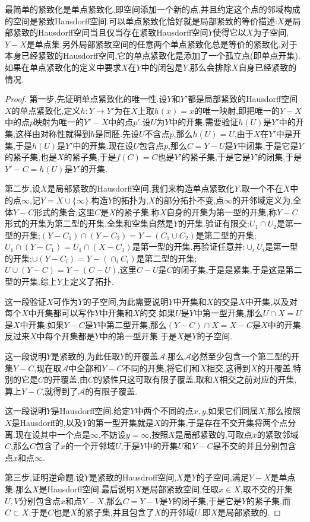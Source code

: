 最简单的紧致化是单点紧致化,即空间添加一个新的点,并且约定这个点的邻域构成的空间是紧致Hausdorff空间.可以单点紧致化恰好就是局部紧致的等价描述:$X$是局部紧致的Hausdorff空间当且仅当存在紧致Hausdorff空间$Y$使得它以$X$为子空间,$Y-X$是单点集.另外局部紧致空间的任意两个单点紧致化总是等价的紧致化.对于本身已经紧致的Hausdorff空间,它的单点紧致化是添加了一个孤立点(即单点开集).如果在单点紧致化的定义中要求$X$在$Y$中的闭包是$Y$,那么会排除$X$自身已经紧致的情况.
\begin{proof}
	
	第一步,先证明单点紧致化的唯一性.设$Y$和$Y'$都是局部紧致的Hausdorff空间$X$的单点紧致化,定义$h:Y\to Y'$为在$X$上取$h(x)=x$的唯一映射,即把唯一的$Y-X$中的点$p$映射为唯一的$Y'-X$中的点$p'$.设$U$为$Y$中的开集,需要验证$h(U)$是$Y'$中的开集,这样由对称性就得到$h$是同胚.先设$U$不含点$p$,那么$h(U)=U$,由于$X$在$Y'$中是开集,于是$h(U)$是$Y'$中的开集.现在设$U$包含点$p$,那么$C=Y-U$是$Y$中闭集,于是它是$Y$的紧子集,也是$X$的紧子集,于是$f(C)=C$也是$Y'$的紧子集,于是它是$Y'$的闭集,于是$Y'-C=h(U)$是$Y'$的开集.
	
	第二步,设$X$是局部紧致的Hausdorff空间,我们来构造单点紧致化$Y$.取一个不在$X$中的点$\infty$,记$Y=X\cup\{\infty\}$.构造$Y$的拓扑为,$X$的部分拓扑不变,点$\infty$的开邻域定义为,全体$Y-C$形式的集合,这里$C$是$X$的紧子集.称$X$自身的开集为第一型的开集,称$Y-C$形式的开集为第二型的开集.全集和空集自然是$Y$的开集.验证有限交:$U_1\cap U_2$是第一型的开集;$(Y-C_1)\cap(Y-C_2)=Y-(C_1\cup C_2)$是第二型的开集;$U_1\cap(Y-C_1)=U_1\cap(X-C_1)$是第一型的开集.再验证任意并:$\cup_i U_i$是第一型的开集;$\cup(Y-C_i)=Y-(\cap_iC_i)$是第二型的开集;$U\cup(Y-C)=Y-(C-U)$,这里$C-U$是$C$的闭子集,于是是紧集,于是这是第二型的开集.综上$Y$上定义了拓扑.
	
	这一段验证$X$可作为$Y$的子空间,为此需要说明$Y$中开集和$X$的交是$X$中开集,以及对每个$X$中开集都可以写作$Y$中开集和$X$的交.如果$U$是$Y$中第一型开集,那么$U\cap X=U$是$X$中开集;如果$Y-C$是$Y$中第二型开集,那么$(Y-C)\cap X=X-C$是$X$中的开集.反过来$X$中每个开集都是$Y$中的第一型开集.于是$X$是$Y$的子空间.
	
	这一段说明$Y$是紧致的,为此任取$Y$的开覆盖$\mathscr{A}$.那么$\mathscr{A}$必然至少包含一个第二型的开集$Y-C$,现在取$\mathscr{A}$中全部和$Y-C$不同的开集,将它们和$X$相交,这得到$X$的开覆盖,特别的它是$C$的开覆盖,由$C$的紧性只这可取有限子覆盖,取和$X$相交之前对应的开集,算上$Y-C$,就得到了$\mathscr{A}$的有限子覆盖.
	
	这一段说明$Y$是Hausdorff空间.给定$Y$中两个不同的点$x,y$,如果它们同属$X$,那么按照$X$是Hausdorff的,以及$Y$的第一型开集就是$X$的开集,于是存在不交开集将两个点分离.现在设其中一个点是$\infty$,不妨设$y=\infty$,按照$X$是局部紧致的,可取点$x$的紧致邻域$C$,那么$C$包含了$x$的一个开邻域$U$,于是$Y$中的开集$U$和$Y-C$是不交的并且分别包含点$x$和点$\infty$.
	
	第三步,证明逆命题.设$Y$是紧致的Hausdroff空间,$X$是$Y$的子空间,满足$Y-X$是单点集.那么$X$是Hausdorff空间.最后说明$X$是局部紧致空间,任取$x\in X$,取不交的开集$U,V$分别包含点$x$和点$Y-X$,那么$C=Y-V$是$Y$的闭子集,于是它是$Y$的紧子集,而$C\subset X$,于是$C$也是$X$的紧子集,并且包含了$X$的开邻域$U$.即$X$是局部紧致的.
\end{proof}

